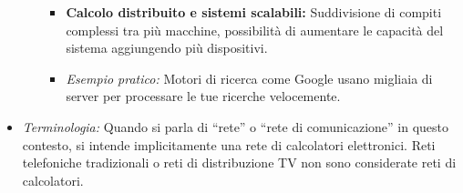 \begin{itemize}
\begin{enumerate}
\begin{itemize}
            \item \textbf{Calcolo distribuito e sistemi scalabili:} Suddivisione di compiti complessi tra più macchine, possibilità di aumentare le capacità del sistema aggiungendo più dispositivi.
            \item \textit{Esempio pratico:} Motori di ricerca come Google usano migliaia di server per processare le tue ricerche velocemente.
        \end{itemize}
    \end{enumerate}
    \item \textit{Terminologia:} Quando si parla di “rete” o “rete di comunicazione” in questo contesto, si intende implicitamente una rete di calcolatori elettronici. Reti telefoniche tradizionali o reti di distribuzione TV non sono considerate reti di calcolatori.
\end{itemize}

